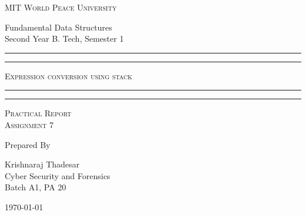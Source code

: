 \documentclass[11pt]{article}
\begin{document}
\begin{titlepage}
	\centering


	\huge\textsc{
		MIT World Peace University
	}\\

	\vspace{0.75\baselineskip} %

	\LARGE{
		Fundamental Data Structures\\
		Second Year B. Tech, Semester 1
	}

	\vfill %


	\rule{\textwidth}{1.6pt}\vspace*{-\baselineskip}\vspace*{2pt}
	\rule{\textwidth}{0.6pt}
	\vspace{0.75\baselineskip} %

	\huge{\textsc{
			Expression conversion using stack
		}} \\



	\vspace{0.5\baselineskip} %
	\rule{\textwidth}{0.6pt}\vspace*{-\baselineskip}\vspace*{2.8pt}
	\rule{\textwidth}{1.6pt}

	\vspace{1\baselineskip} %


	\LARGE\textsc{
		Practical Report\\
		Assignment 7
	} %
	\vfill


	Prepared By
	\vspace{0.5\baselineskip} %

	\Large{
		Krishnaraj Thadesar \\
		Cyber Security and Forensics\\
		Batch A1, PA 20
	}


	\vspace{0.5\baselineskip} %
	\today

\end{titlepage}
\end{document}
